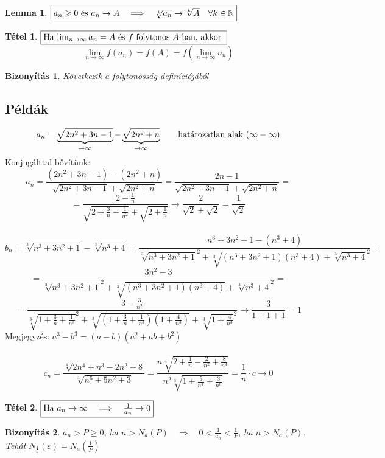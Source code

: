\documentclass[a4paper,12pt,twoside]{book}
\newtheorem{tetel}{Tétel}[chapter]
\newtheorem{lemma}{Lemma}[chapter]
\theoremstyle{break}
\newtheorem{biz}{Bizonyítás}[chapter]
\newtheorem{bizNL}[biz]{Bizonyítás}
\theoremstyle{plain}
\begin{document}
\begin{lemma}$\boxed{a_n\geqslant 0$ és $a_n\to A \quad \Longrightarrow \quad \sqrt[k]{a_n} \to \sqrt[k]{A} \quad \forall k\in\mathbb{N}}$\end{lemma}

\begin{tetel}$\boxed{$Ha $\lim_{n\to\infty}a_n=A $ és $f$ folytonos $A$-ban, akkor $}$
\[\boxed{\lim_{n\to\infty}f(a_n)=f(A)=f(\lim_{n\to\infty}a_n)}\]\end{tetel}
\begin{biz}Következik a folytonosság definíciójából
\end{biz}

\subsection{Példák}
\[a_n = \underbrace{\sqrt{2n^2+3n-1}}_{\to\infty}-\underbrace{\sqrt{2n^2+n}}_{\to\infty} \qquad \hbox{határozatlan alak ($\infty-\infty$)}\]
Konjugálttal bővítünk:
\[a_n = \frac{(2n^2+3n-1)-(2n^2+n)}{\sqrt{2n^2+3n-1}+\sqrt{2n^2+n}} = \frac{2n-1}{\sqrt{2n^2+3n-1}+\sqrt{2n^2+n}} = \]
\[ = \frac{2-\frac{1}{n}}{\sqrt{2+\frac{3}{n}-\frac{1}{n^2}}+\sqrt{2+\frac{1}{n}}} \to \frac{2}{\sqrt{2}+\sqrt{2}} = \frac{1}{\sqrt{2}}\]
\\
\[b_n = \sqrt[3]{n^3+3n^2+1}-\sqrt[3]{n^3+4}=\frac{n^3+3n^2+1-(n^3+4)}{\sqrt[3]{n^3+3n^2+1}^2+\sqrt[3]{(n^3+3n^2+1)(n^3+4)}+\sqrt[3]{n^3+4}^2} = \]
\[= \frac{3n^2-3}{\sqrt[3]{n^3+3n^2+1}^2+\sqrt[3]{(n^3+3n^2+1)(n^3+4)}+\sqrt[3]{n^3+4}^2} = \]
\[= \frac{3-\frac{3}{n^2}}{\sqrt[3]{1+\frac{3}{n}+\frac{1}{n^3}}^2+\sqrt[3]{(1+\frac{3}{n}+\frac{1}{n^3})(1+\frac{4}{n^3})}+\sqrt[3]{1+\frac{4}{n^3}}^2} \to \frac{3}{1+1+1} = 1\]
Megjegyzés: $a^3 - b^3 = (a-b)(a^2+ab+b^2)$\\
\\
\[c_n = \frac{\sqrt[4]{2n^4+n^3-2n^2+8}}{\sqrt[3]{n^6+5n^2+3}} = \frac{n\sqrt[4]{2+\frac{1}{n}-\frac{2}{n^2}+\frac{8}{n^4}}}{n^2\sqrt[3]{1+\frac{5}{n^4}+\frac{3}{n^6}}} = \frac{1}{n}\cdot c \to 0\]

\begin{tetel}$\boxed{$Ha $a_n\to\infty \quad \Longrightarrow \quad \frac{1}{a_n}\to 0}$\end{tetel}
\begin{bizNL}$a_n>P\geqslant 0$, ha $n>N_a(P) \quad \Longrightarrow \quad 0<\frac{1}{a_n}<\frac{1}{P}$, ha $n>N_a(P)$. Tehát $N_{\frac{1}{a}}(\varepsilon)=N_a(\frac{1}{P})$
\end{bizNL}
\end{document}
